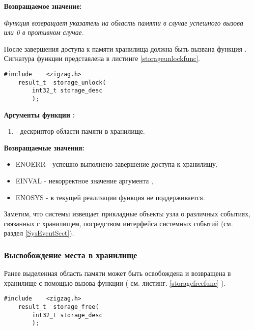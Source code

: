 {\bfseries Возвращаемое значение:}

{\itshape
Функция возвращает указатель на область памяти в случае успешного вызова или 0 в противном случае.
}

После завершения доступа к памяти хранилища должна быть вызвана функция .
Сигнатура функции представлена в листинге \ref{storageunlockfunc}.

\begin{lstlisting}[caption=Функция \myfunc{storage\_unlock()} - завершение доступа, label=storageunlockfunc ]
    #include    <zigzag.h>
    result_t  storage_unlock(
        int32_t storage_desc
        );
\end{lstlisting}

{\bfseries Аргументы функции :}

{\itshape
\begin{enumerate} 
\item {} - дескриптор области памяти в хранилище.
\end{enumerate}
}

{\bfseries Возвращаемые значения:}

{\itshape
\begin{itemize}
\item ENOERR - успешно выполнено завершение доступа к хранилищу,
\item EINVAL - некорректное значение аргумента ,
\item ENOSYS - в текущей реализации функция не поддерживается.
\end{itemize}
}

Заметим, что системы \zigzag извещает прикладные объекты узла о различных событиях, связанных с 
хранилищем, посредством интерфейса системных событий (см. раздел \ref{SysEventSect}).

\subsubsection{ Высвобождение места в хранилище }

Ранее выделенная область памяти может быть освобождена и возвращена в хранилище с помощью
вызова функции  ( см. листинг. \ref{storagefreefunc} ).

\begin{lstlisting}[caption=Функция \myfunc{storage\_free()} - возврат памяти в хранилище, label=storagefreefunc ]
    #include    <zigzag.h>
    result_t  storage_free(
        int32_t storage_desc
        );
\end{lstlisting}

